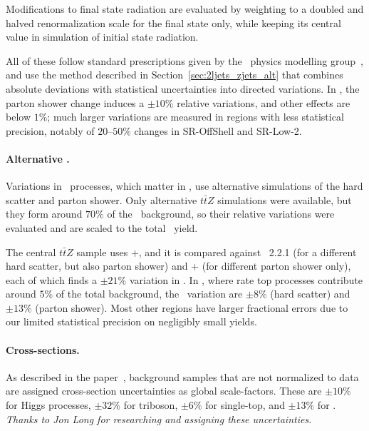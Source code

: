Modifications to final state radiation are evaluated by weighting to a doubled
and halved renormalization scale for the final state only, while keeping
its central value in simulation of initial state radiation.

All of these follow standard prescriptions given by the \atlas\ physics
modelling group~\cite{atlas_twiki_top}, and use the method described in
Section~\ref{sec:2ljets_zjets_alt} that combines absolute deviations with
statistical uncertainties into directed variations.
In \crtt, the parton shower change induces a $\pm10\%$ relative variations,
and other effects are below $1\%$; much larger variations are measured in
regions with less statistical precision, notably of $20\textrm{--}50\%$ changes
in SR-OffShell and SR-Low-2.

\paragraph{Alternative \topother.}
Variations in \topother\ processes, which matter in \srllbb, use
alternative simulations of the hard scatter and parton shower.
Only alternative $t\bar{t}Z$ simulations were available, but they form around
$70\%$ of the \topother\ background, so their relative variations were evaluated
and are scaled to the total \topother\ yield.

The central $t\bar{t}Z$ sample uses \amcatnlo$+$, and it is compared
against \pythia~2.2.1 (for a different hard scatter, but also parton shower)
and \amcatnlo$+$ (for different parton shower only), each of which
finds a $\pm21\%$ variation in \srllbb.
In \crtt,
where rate top processes contribute around $5\%$ of the total background,
the \topother\ variation are
$\pm8\%$ (hard scatter) and
$\pm13\%$ (parton shower).
Most other regions have larger fractional errors due to our limited
statistical precision on negligibly small yields.

\paragraph{Cross-sections.}
As described in the paper~\cite{atlas2022searches},
background samples that are not normalized to data are assigned cross-section
uncertainties as global scale-factors.
These are $\pm10\%$ for Higgs processes,
$\pm32\%$ for triboson,
$\pm6\%$ for single-top,
and $\pm13\%$ for \topother.
\emph{Thanks to Jon Long for researching and assigning these uncertainties.}

